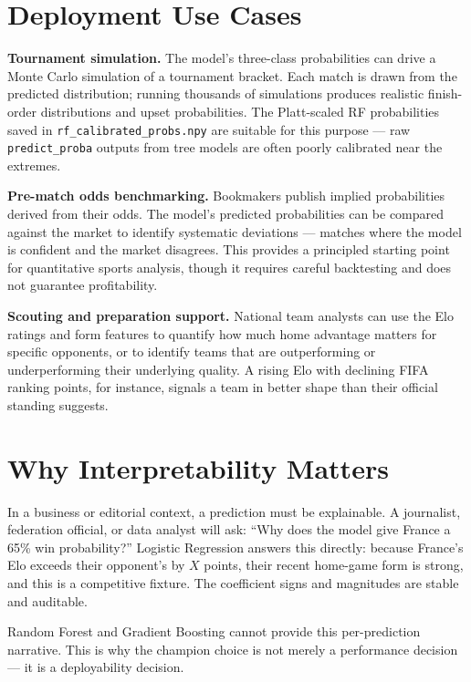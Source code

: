 \documentclass[12pt,a4paper,openany]{report}
\begin{document}
\section{Deployment Use Cases}

\textbf{Tournament simulation.} The model's three-class probabilities can drive a
Monte Carlo simulation of a tournament bracket. Each match is drawn from the
predicted distribution; running thousands of simulations produces realistic
finish-order distributions and upset probabilities. The Platt-scaled RF
probabilities saved in \texttt{rf\_calibrated\_probs.npy} are suitable for this
purpose --- raw \texttt{predict\_proba} outputs from tree models are often poorly
calibrated near the extremes.

\medskip
\textbf{Pre-match odds benchmarking.} Bookmakers publish implied probabilities
derived from their odds. The model's predicted probabilities can be compared
against the market to identify systematic deviations --- matches where the model
is confident and the market disagrees. This provides a principled starting
point for quantitative sports analysis, though it requires careful backtesting
and does not guarantee profitability.

\medskip
\textbf{Scouting and preparation support.} National team analysts can use the Elo
ratings and form features to quantify how much home advantage matters for
specific opponents, or to identify teams that are outperforming or
underperforming their underlying quality. A rising Elo with declining FIFA
ranking points, for instance, signals a team in better shape than their
official standing suggests.

\section{Why Interpretability Matters}

In a business or editorial context, a prediction must be explainable. A
journalist, federation official, or data analyst will ask: ``Why does the model
give France a 65\% win probability?'' Logistic Regression answers this directly:
because France's Elo exceeds their opponent's by $X$ points, their recent
home-game form is strong, and this is a competitive fixture. The coefficient
signs and magnitudes are stable and auditable.

Random Forest and Gradient Boosting cannot provide this per-prediction
narrative. This is why the champion choice is not merely a performance
decision --- it is a deployability decision.
\end{document}
